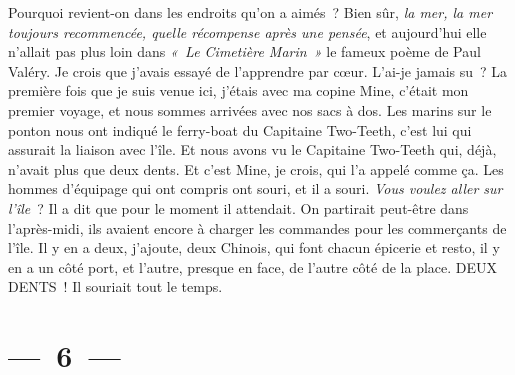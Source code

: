 \documentclass[french,twoside]{book} %
\begin{document}
\noindent Pourquoi revient-on dans les endroits qu’on a aimés ? Bien sûr, \emph{la mer, la mer toujours recommencée, quelle récompense après une pensée}, et aujourd’hui elle n’allait pas plus loin dans\emph{ « Le Cimetière Marin »} le fameux poème de Paul Valéry. Je crois que j’avais essayé de l’apprendre par cœur. L’ai-je jamais su ? La première fois que je suis venue ici, j’étais avec ma copine Mine, c’était mon premier voyage, et nous sommes arrivées avec nos sacs à dos. Les marins sur le ponton nous ont indiqué le ferry-boat du Capitaine Two-Teeth, c’est lui qui assurait la liaison avec l’île. Et nous avons vu le Capitaine Two-Teeth qui, déjà, n’avait plus que deux dents. Et c’est Mine, je crois, qui l’a appelé comme ça. Les hommes d’équipage qui ont compris ont souri, et il a souri. \emph{Vous voulez aller sur l’île} ? Il a dit que pour le moment il attendait. On partirait peut-être dans l’après-midi, ils avaient encore à charger les commandes pour les commerçants de l’île. Il y en a deux, j’ajoute, deux Chinois, qui font chacun épicerie et resto, il y en a un côté port, et l’autre, presque en face, de l’autre côté de la place. DEUX DENTS ! Il souriait tout le temps.

\section[{— 6 —}]{— 6 —}
\renewcommand{\leftmark}{— 6 —}
\end{document}
